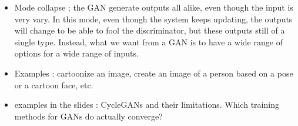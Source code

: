 \documentclass[12pt,a4paper]{article}
\begin{document}
\begin{itemize}
    \item Mode collapse ; the GAN generate outputs all alike, even though the input is very vary. In this
    mode, even though the system keeps updating, the outputs will change to be able to fool
    the discriminator, but these outputs still of a single type. Instead, what we want from a GAN
    is to have a wide range of options for a wide range of inputs.
    
    \item Examples : cartoonize an image, create an image of a person based on a pose or a cartoon face, etc.
    
    \item examples in the slides : CycleGANs and their limitations. Which training methods for GANs
    do actually converge?
\end{itemize}
\end{document}
